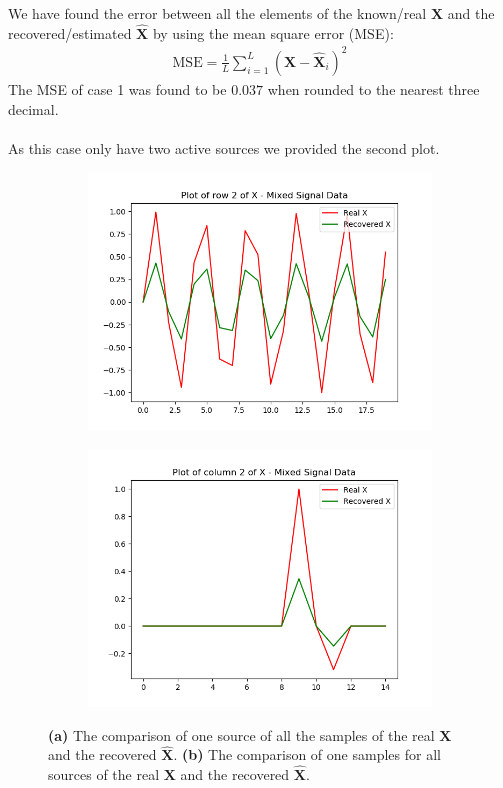 \noindent
We have found the error between all the elements of the known/real $\mathbf{X}$ and the recovered/estimated $\hat{\mathbf{X}}$ by using the mean square error (MSE):
\begin{align*}
\text{MSE} = \frac{1}{L} \sum_{i=1}^L (\mathbf{X} - \hat{\mathbf{X}}_i)^2
\end{align*}
The MSE of case 1 was found to be $0.037$ when rounded to the nearest three decimal.
\\ \\
As this case only have two active sources we provided the second plot.
\begin{figure}[H]
\centering
\begin{subfigure}{0.49\textwidth}
\centering
\includegraphics[width=\textwidth]{figures/cases/case2_3.png}
\caption{}
\label{fig:case2_3}
\end{subfigure}
\begin{subfigure}{0.49\textwidth}
\includegraphics[width=\textwidth]{figures/cases/case2_4.png}
\caption{}
\label{fig:case2_4}
\end{subfigure}
\caption{\textbf{(a)} The comparison of one source of all the samples of the real $\mathbf{X}$ and the recovered $\hat{\mathbf{X}}$. \textbf{(b)} The comparison of one samples for all sources of the real $\mathbf{X}$ and the recovered $\hat{\mathbf{X}}$.}
\end{figure}
\noindent